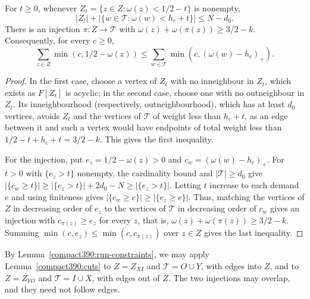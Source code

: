 \begin{lemma}
\label{compact390:cuts}\label{compact390:cuts:rest}
For $t\ge0$, whenever $Z_t=\{z\in Z:\omega(z)<1/2-t\}$ is nonempty,
\[
 |Z_t|+|\{w\in\mathcal T:\omega(w)<h_c+t\}|\le N-d_0.
\]
There is an injection $\pi:Z\to\mathcal T$ with $\omega(z)+\omega(\pi(z))\ge3/2-k$.
Consequently, for every $c\ge0$,
\[
 \sum_{z\in Z}\min(c,1/2-\omega(z))
 \le\sum_{w\in\mathcal T}\min(c,(\omega(w)-h_c)_+).
\]
\end{lemma}
\begin{proof}
In the first case, choose a vertex of $Z_t$ with no inneighbour in $Z_t$, which exists as $F[Z_t]$ is acyclic; in the second case, choose one with no outneighbour in $Z_t$.
Its inneighbourhood (respectively, outneighbourhood), which has at least $d_0$ vertices, avoids $Z_t$ and the vertices of $\mathcal T$ of weight less than $h_c+t$, as an edge between it and such a vertex would have endpoints of total weight
less than $1/2-t+h_c+t=3/2-k$. This gives the first inequality.

For the injection, put $e_z=1/2-\omega(z)>0$ and $c_w=(\omega(w)-h_c)_+$.
For $t>0$ with $\{e_z>t\}$ nonempty, the cardinality bound and $|\mathcal T|\ge d_0$ give $|\{c_w\ge t\}|\ge|\{e_z>t\}|+2d_0-N\ge|\{e_z>t\}|$. Letting $t$ increase to each demand $e$ and using finiteness
gives $|\{c_w\ge e\}|\ge|\{e_z\ge e\}|$.
Thus, matching the vertices of $Z$ in decreasing order of $e_z$ to the vertices of $\mathcal T$ in decreasing order of $c_w$ gives an injection with $c_{\pi(z)}\ge e_z$ for every $z$, that is, $\omega(z)+\omega(\pi(z))\ge3/2-k$. Summing $\min(c,e_z)\le\min(c,c_{\pi(z)})$ over $z\in Z$ gives the last inequality.
\end{proof}
By Lemma~\ref{compact390:run-constraints}, we may apply Lemma~\ref{compact390:cuts} to $Z=Z_{XI}$ and $\mathcal T=O\cup Y$, with edges into $Z$,
and to $Z=Z_{YO}$ and $\mathcal T=I\cup X$, with edges out of $Z$.
The two injections may overlap, and they need not follow edges.

